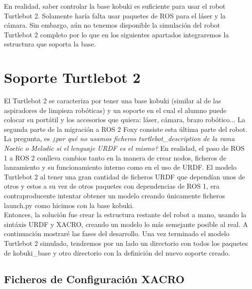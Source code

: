 En realidad, saber controlar la base kobuki es suficiente para usar el robot Turtlebot 2. Solamente haría falta usar paquetes de ROS para el láser y la cámara. Sin embargo, aún no tenemos disponible la simulación del robot Turtlebot 2 completo por lo que en los siguientes apartados integraremos la estructura que soporta la base.



\section{Soporte Turtlebot 2}
\label{sec:soporte_turtlebot2}

El Turtlebot 2 se caracteriza por tener una base kobuki (similar al de las aspiradores de limpieza robóticas) y un soporte en el cual el alumno puede colocar su portátil y los accesorios que quiera: láser, cámara, brazo robótico... La segunda parte de la migración a ROS 2 Foxy consiste esta última parte del robot.\\

La pregunta, es \textit{¿por qué no usamos ficheros turtlebot\_description de la rama Noetic o Melodic si el lenguaje URDF es el mismo?} En realidad, el paso de ROS 1 a ROS 2 conlleva cambios tanto en la manera de crear nodos, ficheros de lanzamiento y su funcionamiento interno como en el uso de URDF. El modelo Turtlebot 2 al tener una gran cantidad de ficheros URDF que dependían unos de otros y estos a su vez de otros paquetes con dependencias de ROS 1, era contraproducente intentar obtener un modelo creando únicamente ficheros launch.py como hicimos con la base kobuki.\\

Entonces, la solución fue crear la estructura restante del robot a mano, usando la sintáxis URDF y XACRO, creando un modelo lo más semejante posible al real. A continuación mostraré las fases del desarrollo. Una vez terminado el modelo Turtlebot 2 simulado, tendremos por un lado un directorio con todos los paquetes de kobuki\_base y otro directorio con la definición del nuevo soporte creado.



\subsection{Ficheros de Configuración XACRO}
\label{sec:turtlebot2_xacro}

